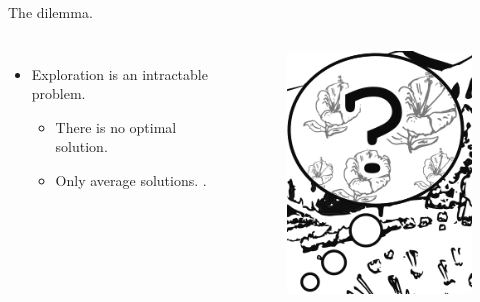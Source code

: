 \documentclass[10pt]{beamer}
\begin{document}
\begin{frame}[fragile]{The dilemma.}
\begin{columns}
\centering
\begin{itemize}
    \item Exploration is an intractable problem.
    \begin{itemize}
    \item There is no optimal solution.
    \item Only average solutions. \cite{Thrun1992a,Dayan1996,Findling2018,Gershman2018b}.
    \end{itemize}
\end{itemize}

\centering
\begin{figure}
    \centering
    \includegraphics[scale=1.5]{images/bee_explore.png} 
    \caption{}
\end{figure}
\end{columns}
\end{frame}
\end{document}

